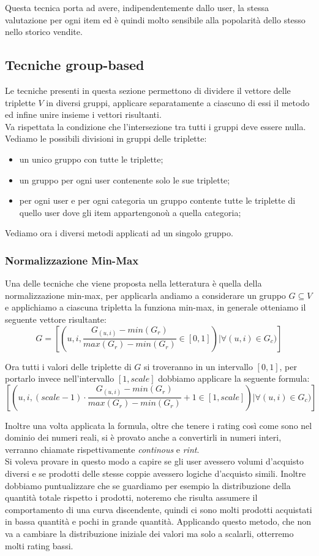 Questa tecnica porta ad avere, indipendentemente dallo user, la stessa valutazione per ogni item ed è quindi molto sensibile alla popolarità dello stesso nello storico vendite.

\subsection{Tecniche group-based}
Le tecniche presenti in questa sezione permettono di dividere il vettore delle triplette $V$ in diversi gruppi, applicare separatamente a ciascuno di essi il metodo ed infine unire insieme i vettori risultanti. \\
Va rispettata la condizione che l'intersezione tra tutti i gruppi deve essere nulla.\\
Vediamo le possibili divisioni in gruppi delle triplette:
\begin{itemize}
    \item un unico gruppo con tutte le triplette;
    \item un gruppo per ogni user contenente solo le sue triplette;
    \item per ogni user e per ogni categoria un gruppo contente tutte le triplette di quello user dove gli item appartengonoù a quella categoria;
\end{itemize}

Vediamo ora i diversi metodi applicati ad un singolo gruppo.
\subsubsection{Normalizzazione Min-Max}
Una delle tecniche che viene proposta nella letteratura è quella della normalizzazione min-max, per applicarla andiamo a considerare un gruppo $G \subseteq V$ e applichiamo a ciascuna tripletta la funziona min-max, in generale otteniamo il seguente vettore risultante:
$$G = [(u, i, \frac{G_{(u,i)} - min(G_r)}{max(G_r) - min(G_r)} \in [0,1]) |  \forall (u,i) \in G_{c})]$$

Ora tutti i valori delle triplette di $G$ si troveranno in un intervallo $[0,1]$, per portarlo invece nell'intervallo $[1,scale]$ dobbiamo applicare la seguente formula:
$$[(u, i, (scale -1) \cdot \frac{G_{(u,i)} - min(G_r)}{max(G_r) - min(G_r)} + 1 \in [1,scale]) |  \forall (u,i) \in G_{c})]$$

Inoltre una volta applicata la formula, oltre che tenere i rating così come sono nel dominio dei numeri reali, si è provato anche a convertirli in numeri interi, verranno chiamate rispettivamente \textit{continous} e \textit{rint}.\\
Si voleva provare in questo modo a capire se gli user avessero volumi d'acquisto diversi e se prodotti delle stesse coppie avessero logiche d'acquisto simili. 
Inoltre dobbiamo puntualizzare che se guardiamo per esempio la distribuzione della quantità totale rispetto i prodotti, noteremo che risulta assumere il comportamento di una curva discendente, quindi ci sono molti prodotti acquistati in bassa quantità e pochi in grande quantità. Applicando questo metodo, che non va a cambiare la distribuzione iniziale dei valori ma solo a scalarli, otterremo molti rating bassi.


